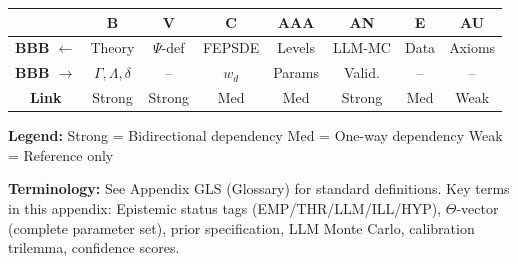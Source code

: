 \documentclass[11pt,a4paper]{article}
\theoremstyle{definition}
\begin{document}
\begin{tcolorbox}[colback=gray!5!white, colframe=gray!75!black, 
    title=\textbf{Cross-Reference Map}]

\begin{center}
\small
\begin{tabular}{@{}c|ccccccc@{}}
\toprule
& \textbf{B} & \textbf{V} & \textbf{C} & \textbf{AAA} & \textbf{AN} & \textbf{E} & \textbf{AU} \\
\midrule
\textbf{BBB $\leftarrow$} & Theory & $\Psi$-def & FEPSDE & Levels & LLM-MC & Data & Axioms \\
\textbf{BBB $\rightarrow$} & $\Gamma,\Lambda,\delta$ & -- & $w_d$ & Params & Valid. & -- & -- \\
\midrule
\textbf{Link} & \cellcolor{red!20}Strong & \cellcolor{red!20}Strong & \cellcolor{yellow!20}Med & \cellcolor{yellow!20}Med & \cellcolor{red!20}Strong & \cellcolor{yellow!20}Med & \cellcolor{green!20}Weak \\
\bottomrule
\end{tabular}
\end{center}

\textbf{Legend:} 
\colorbox{red!20}{Strong} = Bidirectional dependency \quad
\colorbox{yellow!20}{Med} = One-way dependency \quad
\colorbox{green!20}{Weak} = Reference only

\end{tcolorbox}


\begin{tcolorbox}[colback=gray!5!white, colframe=gray!50!black]
\textbf{Terminology:} See Appendix GLS (Glossary) for standard definitions.
Key terms in this appendix: Epistemic status tags (EMP/THR/LLM/ILL/HYP),
$\Theta$-vector (complete parameter set), prior specification,
LLM Monte Carlo, calibration trilemma, confidence scores.
\end{tcolorbox}
\end{document}
